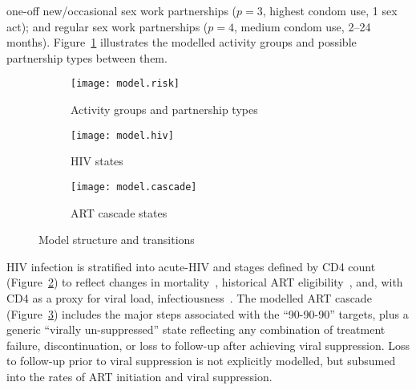 one-off new/occasional sex work partnerships ($p=3$, highest condom use, 1 sex act);
and regular sex work partnerships ($p=4$, medium condom use, 2--24 months).
Figure~\ref{fig:model.risk} illustrates
the modelled activity groups and possible partnership types between them.
\begin{figure}
  \begin{subfigure}{\linewidth}
    \texttt{[image: model.risk]}
    \caption{Activity groups and partnership types}
    \label{fig:model.risk}
  \end{subfigure}
  \begin{subfigure}{\linewidth}
    \texttt{[image: model.hiv]}
    \caption{HIV states}
    \label{fig:model.hiv}
  \end{subfigure}
  \begin{subfigure}{\linewidth}
    \texttt{[image: model.cascade]}
    \caption{ART cascade states}
    \label{fig:model.cascade}
  \end{subfigure}
  \caption{Model structure and transitions}
  \label{fig:model}
\end{figure}
\par
HIV infection is stratified into
acute-HIV and stages defined by CD4 count (Figure~\ref{fig:model.hiv})
to reflect changes in mortality~\cite{Mangal2017},
historical ART eligibility~\cite{EswMOH2006,EswMOH2010,EswMOH2015,EswMOH2018},
and, with CD4 as a proxy for viral load, infectiousness~\cite{Boily2009}.
The modelled ART cascade (Figure~\ref{fig:model.cascade})
includes the major steps associated with the ``90-90-90'' targets,
plus a generic ``virally un-suppressed'' state reflecting any combination of
treatment failure, discontinuation, or loss to follow-up after achieving viral suppression.
Loss to follow-up prior to viral suppression is not explicitly modelled,
but subsumed into the rates of ART initiation and viral suppression.
